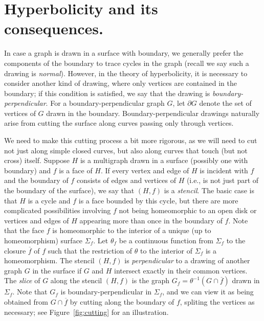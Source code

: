 \documentclass[12pt,twoside,openright,a4paper]{book}
\begin{document}
\section{Hyperbolicity and its consequences.}

In case a graph is drawn in a surface with boundary, we generally prefer the components of the boundary to trace
cycles in the graph (recall we say such a drawing is \emph{normal}).  However, in the theory of hyperbolicity, it is necessary to
consider another kind of drawing, where only vertices are contained in the boundary; if this condition is satisfied,
we say that the drawing is \emph{boundary-perpendicular}.  For a boundary-perpendicular graph $G$, let $\partial G$
denote the set of vertices of $G$ drawn in the boundary.  Boundary-perpendicular drawings naturally arise from cutting
the surface along curves passing only through vertices.

We need to make this cutting process a bit more rigorous, as we will need to cut not just along simple closed curves,
but also along curves that touch (but not cross) itself.  Suppose $H$ is a multigraph drawn in a surface (possibly one with boundary)
and $f$ is a face of $H$.  If every vertex and edge of $H$ is incident with $f$ and the boundary of $f$ consists of edges and vertices
of $H$ (i.e., is not just part of the boundary of the surface), we say that $(H,f)$ is a \emph{stencil}.
The basic case is that $H$ is a cycle and $f$ is a face bounded by this cycle, but there are more complicated possibilities
involving $f$ not being homeomorphic to an open disk or vertices and edges of $H$ appearing more than once in the boundary of $f$.
Note that the face $f$ is homeomorphic to the interior of a unique (up to homeomorphism) surface $\Sigma_f$.
Let $\theta_f$ be a continuous function from $\Sigma_f$ to the closure $\overline{f}$ of $f$ such that the restriction of $\theta$ to the interior
of $\Sigma_f$ is a homeomorphism.
The stencil $(H,f)$ is \emph{perpendicular} to a drawing of another graph $G$ in the surface if $G$ and $H$ intersect exactly
in their common vertices.  The \emph{slice} of $G$ along the stencil $(H,f)$ is the graph $G_f=\theta^{-1}(G\cap \overline{f})$
drawn in $\Sigma_f$.  Note that $G_f$ is boundary-perpendicular in $\Sigma_f$, and we can view it as being obtained from
$G\cap \overline{f}$ by cutting along the boundary of $f$, spliting the vertices as necessary; see Figure~\ref{fig:cutting}
for an illustration.
\end{document}
